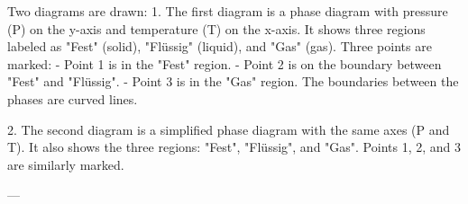 Two diagrams are drawn:  
1. The first diagram is a phase diagram with pressure (P) on the y-axis and temperature (T) on the x-axis. It shows three regions labeled as "Fest" (solid), "Flüssig" (liquid), and "Gas" (gas). Three points are marked:  
   - Point 1 is in the "Fest" region.  
   - Point 2 is on the boundary between "Fest" and "Flüssig".  
   - Point 3 is in the "Gas" region.  
   The boundaries between the phases are curved lines.  

2. The second diagram is a simplified phase diagram with the same axes (P and T). It also shows the three regions: "Fest", "Flüssig", and "Gas". Points 1, 2, and 3 are similarly marked.  

---